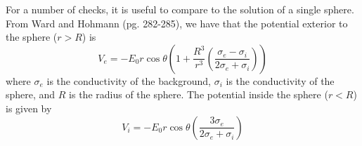 For a number of checks, it is useful to compare to the solution of a single sphere. From Ward and Hohmann (pg. 282-285), we have that the potential exterior to the sphere ($r > R$) is
\begin{equation}
    V_e = -E_0 r \cos \theta \left(1 + \frac{R^3}{r^3}\left(\frac{\sigma_e-\sigma_i}{2\sigma_e+\sigma_i}\right)\right)
    \label{eq:Ve}
\end{equation}
where $\sigma_e$ is the conductivity of the background, $\sigma_i$ is the conductivity of the sphere, and $R$ is the radius of the sphere. The potential inside the sphere ($r < R$) is given by
\begin{equation}
    V_i = -E_0r\cos\theta\left(\frac{3\sigma_e}{2\sigma_e+\sigma_i}\right)
    \label{eq:Vi}
\end{equation}

